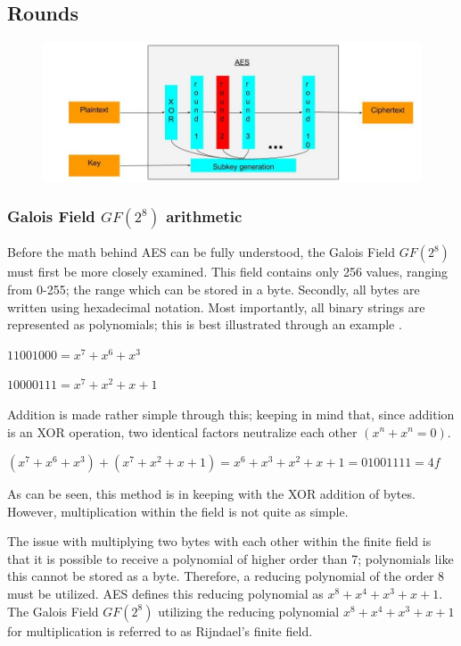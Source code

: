 \documentclass[12pt]{report}
\begin{document}
\subsection{Rounds}

\begin{figure}[H]
\centering
\includegraphics[scale=0.4]{AES_fig3.jpg}
\end{figure}

\subsubsection{Galois Field $GF(2^8)$ arithmetic}
Before the math behind AES can be fully understood, the Galois Field $GF(2^8)$ must first be more closely examined. This field contains only 256 values, ranging from 0-255; the range which can be stored in a byte. Secondly, all bytes are written using hexadecimal notation. Most importantly, all binary strings are represented as polynomials; this is best illustrated through an example \cite{GFieldExample}.

$11001000 = x^7+x^6+x^3$

$10000111 = x^7+x^2+x+1$

Addition is made rather simple through this; keeping in mind that, since addition is an XOR operation, two identical factors neutralize each other $(x^n+x^n = 0)$.

$(x^7+x^6+x^3)+(x^7+x^2+x+1) = x^6+x^3+x^2+x+1 = 01001111 = 4f$

As can be seen, this method is in keeping with the XOR addition of bytes. However, multiplication within the field is not quite as simple.

The issue with multiplying two bytes with each other within the finite field is that it is possible to receive a polynomial of higher order than 7; polynomials like this cannot be stored as a byte. Therefore, a reducing polynomial of the order 8 must be utilized. AES defines this reducing polynomial as $x^8+x^4+x^3+x+1$. The Galois Field $GF(2^8)$ utilizing the reducing polynomial $x^8+x^4+x^3+x+1$ for multiplication is referred to as Rijndael's finite field\cite{RFiniteField}.
\end{document}
